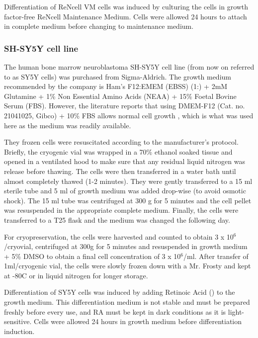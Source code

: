 \documentclass[onecolumn,10pt]{asme2ej}
\begin{document}
Differentiation of ReNcell VM cells was induced by culturing the cells in growth factor-free ReNcell Maintenance Medium. Cells were allowed 24 hours to attach in complete medium before changing to maintenance medium.


\subsubsection{SH-SY5Y cell line}
The human bone marrow neuroblastoma SH-SY5Y cell line (from now on referred to as SY5Y cells) was purchased from Sigma-Aldrich. The growth medium recommended by the company is Ham's F12:EMEM (EBSS) (1:) + 2mM Glutamine + 1\% Non Essential Amino Acids (NEAA) + 15\% Foetal Bovine Serum (FBS). However, the literature reports that using DMEM-F12 (Cat. no. 21041025, Gibco) + 10\% FBS allows normal cell growth \cite{Kovalevich2013}, which is what was used here as the medium was readily available.

They frozen cells were resuscitated according to the manufacturer's protocol. Briefly, the cryogenic vial was wrapped in a 70\% ethanol soaked tissue and opened in a ventilated hood to make sure that any residual liquid nitrogen was release before thawing. The cells were then transferred in a water bath until almost completely thawed (1-2 minutes). They were gently transferred to a 15 ml sterile tube and 5 ml of growth medium was added drop-wise (to avoid osmotic shock). The 15 ml tube was centrifuged at 300 g for 5 minutes and the cell pellet was resuspended in the appropriate complete medium. Finally, the cells were transferred to a T25 flask and the medium was changed the following day. 

For cryopreservation, the cells were harvested and counted to obtain 3 x 10$^6$/cryovial, centrifuged at 300g for 5 minutes and resuspended in growth medium + 5\% DMSO to obtain a final cell concentration of 3 x 10$^6$/ml. After transfer of 1ml/cryogenic vial, the cells were slowly frozen down with a Mr. Frosty and kept at -80C or in liquid nitrogen for longer storage. 


Differentiation of SY5Y cells was induced by adding Retinoic Acid () to the growth medium. This differentiation medium is not stable and must be prepared freshly before every use, and RA must be kept in dark conditions as it is light-sensitive. Cells were allowed 24 hours in growth medium before differentiation induction.

 
\end{document}

